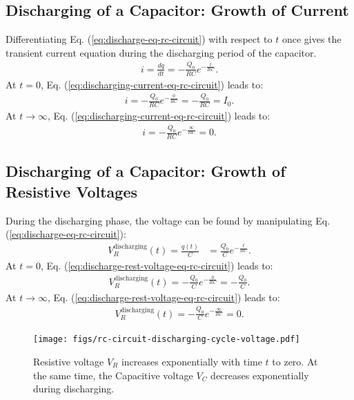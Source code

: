 \documentclass[12pt,b4paper]{article}
\begin{document}
\subsection{Discharging of a Capacitor: Growth of Current}
Differentiating Eq. (\ref{eq:discharge-eq-rc-circuit}) with respect to $t$ once gives the transient current equation during the discharging period of the capacitor.
\begin{align}
    i=\frac{dq}{dt}=-\frac{Q_0}{RC}e^{\displaystyle-\frac{t}{RC}}.\label{eq:discharging-current-eq-rc-circuit}
\end{align}
At $t=0$, Eq. (\ref{eq:discharging-current-eq-rc-circuit}) leads to:
\begin{align*}
    i=-\frac{Q_0}{RC}e^{\displaystyle-\frac{0}{RC}}=-\frac{Q_0}{RC}=I_0.
\end{align*}
At $t\to\infty$, Eq. (\ref{eq:discharging-current-eq-rc-circuit}) leads to:
\begin{align*}
    i=-\frac{Q_0}{RC}e^{\displaystyle-\frac{\infty}{RC}}=0.
\end{align*}
\subsection{Discharging of a Capacitor: Growth of Resistive Voltages}
During the discharging phase, the voltage can be found by manipulating Eq. (\ref{eq:discharge-eq-rc-circuit}):
\begin{align}
    V_R^\text{discharging}(t)=\frac{q(t)}{C}&=\frac{Q_0}{C}e^{\displaystyle-\frac{t}{RC}}.\label{eq:discharge-rest-voltage-eq-rc-circuit}
\end{align}
At $t=0$, Eq. (\ref{eq:discharge-rest-voltage-eq-rc-circuit}) leads to:
\begin{align*}
    V_R^\text{discharging}(t)=-\frac{Q_0}{C}e^{\displaystyle-\frac{0}{RC}}=-\frac{Q_0}{C}.
\end{align*}
At $t\to\infty$, Eq. (\ref{eq:discharge-rest-voltage-eq-rc-circuit}) leads to:
\begin{align*}
    V_R^\text{discharging}(t)=-\frac{Q_0}{C}e^{\displaystyle-\frac{\infty}{RC}}=0.
\end{align*}
\begin{figure}
    \centering
    \texttt{[image: figs/rc-circuit-discharging-cycle-voltage.pdf]}
    \caption{Resistive voltage $V_R$ increases exponentially with time $t$ to zero. At the same time, the Capacitive voltage $V_C$ decreases exponentially during discharging.}
    \label{fig:rc-circuit-discharging-cycle-voltage}
\end{figure}
\end{document}
